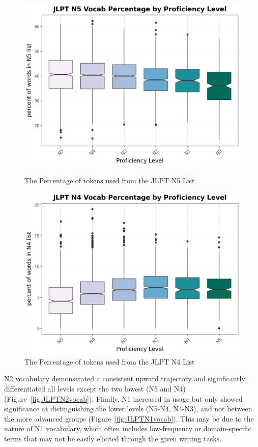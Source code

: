 \begin{figure}[htbp]
    \centering
    \begin{minipage}{.48\textwidth}
        \centering
    \includegraphics[scale=.4]{img/LFP/JLPT_N5}
    \caption[Percentage of tokens used from the JLPT N5 List]{The Percentage of tokens used from the JLPT N5 List}
        \label{fig:JLPTN5vocab}
    \end{minipage}
    \hfill
\begin{minipage}{.48\textwidth}
        \centering
        \includegraphics[scale=.4]{img/LFP/JLPT_N4}
        \caption[Percentage of tokens used from the JLPT N4 List]{The Percentage of tokens used from the JLPT N4 List}
\label{fig:JLPTN4vocab}
\end{minipage}
    \end{figure}
N2 vocabulary demonstrated a consistent upward trajectory and significantly differentiated all levels
except the two lowest (N5 and N4) (Figure~\ref{fig:JLPTN2vocab}). Finally, N1 increased in usage but only showed
significance at
distinguishing
the lower levels (N5-N4, N4-N3), and not between the more advanced groups (Figure~\ref{fig:JLPTN1vocab}). This 
may be due to the nature
of N1 vocabulary, which often includes low-frequency or domain-specific terms that may not be easily elicited
through the given writing tasks. 

